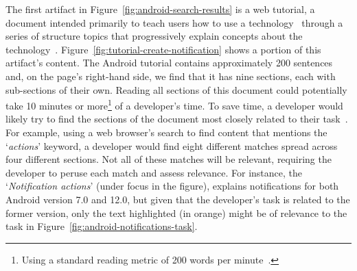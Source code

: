 


The first artifact in Figure~\ref{fig:android-search-results}
is a 
 web tutorial, a document intended primarily to teach users how to use 
a technology~\cite{arya2020} through a series of structure topics 
that progressively explain concepts about the technology~\cite{Jiang2016b, Jiang2017}. 
Figure~\ref{fig:tutorial-create-notification} 
shows a portion of this artifact's content. 
The Android tutorial contains  approximately 200 sentences
and, on the page's right-hand side, we find that 
it
has nine sections, each with sub-sections of their own. 
Reading all sections of this document could potentially 
take 10 minutes or more\footnote{Using a standard reading metric of 200 words per minute~\cite{Just1980}.} of a developer's time.
To save time, a developer would likely try to find the sections of the document
most closely related to their task~\cite{Li2013}.
For example, using a web browser's search to find content that mentions the `\textit{actions}' keyword, 
a developer would find eight different matches spread across four different sections.
Not all of these matches will be relevant, requiring the developer to peruse each
match and assess relevance. 
For instance, the `\textit{Notification actions}'
 (under focus in the figure), 
explains 
notifications for both Android version 7.0 and 12.0, 
 but given that the developer's task is related to the former version,
only the text highlighted (in orange)
might be of relevance to the task in Figure~\ref{fig:android-notifications-task}.






